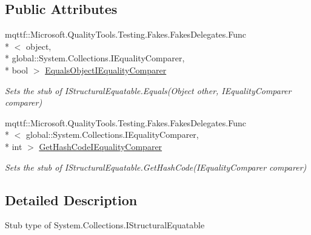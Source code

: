 \subsection*{Public Attributes}
\begin{DoxyCompactItemize}
\item 
mqttf\-::\-Microsoft.\-Quality\-Tools.\-Testing.\-Fakes.\-Fakes\-Delegates.\-Func\\*
$<$ object, \\*
global\-::\-System.\-Collections.\-I\-Equality\-Comparer, \\*
bool $>$ \hyperlink{class_system_1_1_collections_1_1_fakes_1_1_stub_i_structural_equatable_a0cf7fd5bb2c000f142126f7774069930}{Equals\-Object\-I\-Equality\-Comparer}
\begin{DoxyCompactList}\small\item\em Sets the stub of I\-Structural\-Equatable.\-Equals(\-Object other, I\-Equality\-Comparer comparer)\end{DoxyCompactList}\item 
mqttf\-::\-Microsoft.\-Quality\-Tools.\-Testing.\-Fakes.\-Fakes\-Delegates.\-Func\\*
$<$ global\-::\-System.\-Collections.\-I\-Equality\-Comparer, \\*
int $>$ \hyperlink{class_system_1_1_collections_1_1_fakes_1_1_stub_i_structural_equatable_aafdcb31f71c4e922cd448ed44d65d8d4}{Get\-Hash\-Code\-I\-Equality\-Comparer}
\begin{DoxyCompactList}\small\item\em Sets the stub of I\-Structural\-Equatable.\-Get\-Hash\-Code(\-I\-Equality\-Comparer comparer)\end{DoxyCompactList}\end{DoxyCompactItemize}


\subsection{Detailed Description}
Stub type of System.\-Collections.\-I\-Structural\-Equatable



